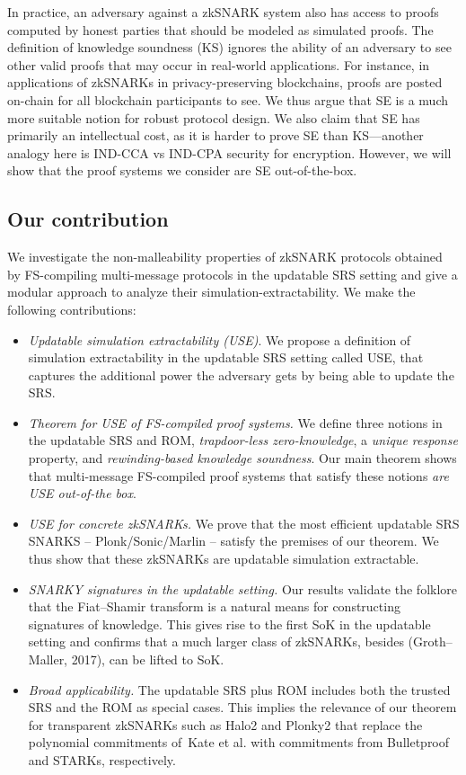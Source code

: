 \documentclass[11pt]{llncs}
\begin{document}
In practice, an adversary against a zkSNARK system also has access to proofs
computed by honest parties that should be modeled as simulated proofs. The
definition of knowledge soundness (KS) ignores the ability of an adversary to
see other valid proofs that may occur in real-world applications. For instance,
in applications of zkSNARKs in privacy-preserving blockchains, proofs are
posted on-chain for all blockchain participants to see. We thus argue that SE
is a much more suitable notion for robust protocol design. We also claim that
SE has primarily an intellectual cost, as it is harder to prove SE than
KS---another analogy here is IND-CCA vs IND-CPA security for encryption.
However, we will show that the proof systems we consider are SE out-of-the-box.

\subsection{Our contribution}
We investigate the non-malleability properties of zkSNARK protocols obtained by FS-compiling multi-message protocols in the updatable SRS setting and give a modular approach to analyze their simulation-extractability. We make the following contributions:
\begin{itemize}
\item 
\emph{Updatable simulation extractability (USE)}. 
We propose a definition of simulation extractability in the updatable SRS setting called USE, that captures the additional power the adversary gets by being able to update the SRS. 
    
\item \emph{Theorem for USE of FS-compiled proof systems.} We
         define three notions in the updatable SRS and ROM, 
        \emph{trapdoor-less zero-knowledge},
        a \emph{unique response} property, and \emph{rewinding-based
        knowledge soundness}. Our main theorem shows that multi-message FS-compiled proof systems that satisfy these notions \emph{are USE
        out-of-the box}.
    
\item
\emph{USE for concrete zkSNARKs.}
We prove that the most efficient updatable SRS SNARKS -- Plonk/Sonic/Marlin -- satisfy the premises of our theorem. We thus show that these zkSNARKs are updatable simulation extractable.

\item
  \emph{SNARKY signatures in the updatable setting.} Our results validate the folklore that the Fiat--Shamir transform is a natural means for constructing signatures of knowledge. This gives rise to the first SoK in the updatable setting and confirms that a much larger class of zkSNARKs, besides (Groth--Maller, 2017), can be lifted to SoK.

\item \emph{Broad applicability.} The updatable SRS plus ROM includes both the trusted SRS and the ROM as special cases. This implies the relevance of our theorem for transparent zkSNARKs such as Halo2 and Plonky2 that replace the polynomial commitments of~Kate et al. with commitments from Bulletproof and STARKs, respectively.
  
\end{itemize}
\end{document}
